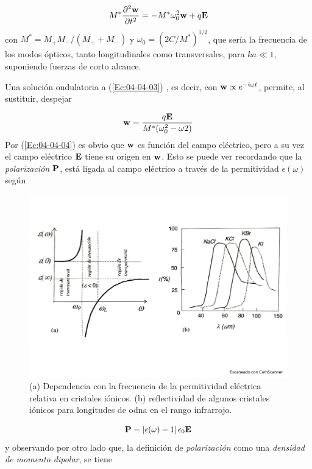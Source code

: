 \begin{equation}
	M^* \frac{\partial ^2 \mathbf{w}}{\partial t^2} = - M^*  \omega_0^2 \mathbf{w} + q \mathbf{E} \label{Ec:04-04-03}
\end{equation}
con $M^*=M_+M_-/(M_++M_-)$ y $\omega_0=(2C/M^*)^{1/2}$, que sería la frecuencia de los modos ópticos, tanto longitudinales como transversales, para $ka\ll 1$, suponiendo fuerzas de corto alcance. 

Una solución ondulatoria a (\ref{Ec:04-04-03}) , es decir, con $\mathbf{w}\propto e^{-i\omega t}$, permite, al sustituir, despejar

\begin{equation}
	\mathbf{w} = \frac{q\mathbf{E}}{M^* (\omega_0^2 - \omega2)}\label{Ec:04-04-04}
\end{equation}
Por (\ref{Ec:04-04-04}) es obvio que $\mathbf{w}$ es función del campo eléctrico, pero a su vez el campo eléctrico $\mathbf{E}$ tiene su origen en $\mathbf{w}$. Esto se puede ver recordando que la \textit{polarización} $\mathbf{P}$, está ligada al campo eléctrico a través de la permitividad $\epsilon (\omega)$ según 

\begin{figure}[h!] \centering
	\includegraphics[scale=0.4]{Cuerpo/Ch_04/Fotos libro 8.pdf}
	\caption{(a) Dependencia con la frecuencia de la permitividad eléctrica relativa en cristales iónicos. (b) reflectividad de algunos cristales iónicos para longitudes de odna en el rango infrarrojo.}
	\label{Fig:04-08}
\end{figure}    


\begin{equation}
	\mathbf{P} = \left[ \epsilon (\omega) -1  \right] \epsilon_0  \mathbf{E}
\end{equation}
y observando por otro lado que, la definición de \textit{polarización} como una \textit{densidad de momento dipolar}, se tiene  

